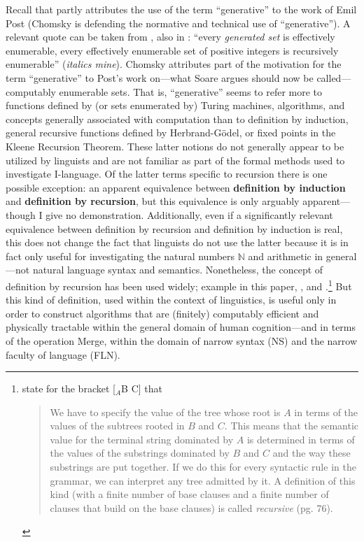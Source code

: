 \documentclass[11pt,twoside]{article}
\begin{document}
Recall that \cite[9]{chomsky65aspects} partly attributes the use of the term ``generative'' to the work of Emil Post (Chomsky is defending the normative and technical use of ``generative''). A relevant quote can be taken from \cite[286]{post:1944}, also in \cite{soare:2008}: ``every \textsl{generated set} is effectively enumerable, every effectively enumerable set of positive integers is recursively enumerable'' (\textsl{italics mine}). Chomsky attributes part of the motivation for the term ``generative'' to Post's work on---what Soare argues should now be called---computably enumerable sets. That is, ``generative'' seems to refer more to functions defined by (or sets enumerated by) Turing machines, algorithms, and concepts generally associated with computation than to definition by induction, general recursive functions defined by Herbrand-G\"odel, or fixed points in the Kleene Recursion Theorem. These latter notions do not generally appear to be utilized by linguists and are not familiar as part of the formal methods used to investigate I-language. Of the latter terms specific to recursion there is one possible exception: an apparent equivalence between \textbf{definition by induction} and \textbf{definition by recursion}, but this equivalence is only arguably apparent---though I give no demonstration. Additionally, even if a significantly relevant equivalence between definition by recursion and definition by induction is real, this does not change the fact that linguists do not use the latter because it is in fact only useful for investigating the natural numbers $\mathbb{N}$ and arithmetic in general---not natural language syntax and semantics. Nonetheless, the concept of definition by recursion has been used widely; example  in this paper, \cite{pmw:1990}, and \cite{chmg:2000}.\footnote{\cite{chmg:2000} state for the bracket [$_{A}$B C] that \begin{quotation} We have to specify the value of the tree whose root is $A$ in terms of the values of the subtrees rooted in $B$ and $C$. This means that the semantic value for the terminal string dominated by $A$ is determined in terms of the values of the substrings dominated by $B$ and $C$ and the way these substrings are put together. If we do this for every syntactic rule in the grammar, we can interpret any tree admitted by it. A definition of this kind (with a finite number of base clauses and a finite number of clauses that build on the base clauses) is called \textsl{recursive} (pg. 76). \end{quotation}} But this kind of definition, used within the context of linguistics, is useful only in order to construct algorithms that are (finitely) computably efficient and physically tractable within the general domain of human cognition---and in terms of the operation Merge, within the domain of narrow syntax (NS) and the narrow faculty of language (FLN).
\end{document}
